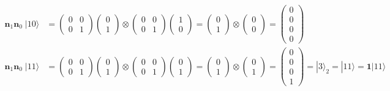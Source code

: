 \documentclass{article}
\begin{document}
\begin{align*}
\bm{n}_1\bm{n}_0 \; |10\rangle
  &= \begin{pmatrix}0 & 0\\0 & 1\end{pmatrix}
     \begin{pmatrix}0\\1\end{pmatrix}
     \otimes
     \begin{pmatrix}0 & 0\\0 & 1\end{pmatrix}
     \begin{pmatrix}1\\0\end{pmatrix}
     = \begin{pmatrix}0\\1\end{pmatrix}
     \otimes
     \begin{pmatrix}0\\0\end{pmatrix}
     = \begin{pmatrix}0\\0\\0\\0\end{pmatrix}\\
\bm{n}_1\bm{n}_0 \; |11\rangle
  &= \begin{pmatrix}0 & 0\\0 & 1\end{pmatrix}
     \begin{pmatrix}0\\1\end{pmatrix}
     \otimes
     \begin{pmatrix}0 & 0\\0 & 1\end{pmatrix}
     \begin{pmatrix}0\\1\end{pmatrix}
     = \begin{pmatrix}0\\1\end{pmatrix}
     \otimes
     \begin{pmatrix}0\\1\end{pmatrix}
     = \begin{pmatrix}0\\0\\0\\1\end{pmatrix}
     = |3\rangle_{2} = |11\rangle = \bm{1}|11\rangle\\
\end{align*}
\end{document}
